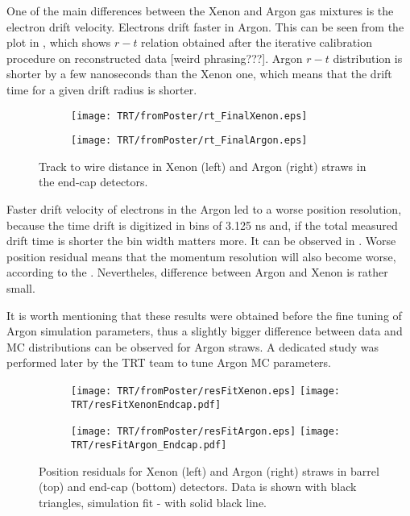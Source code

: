 One of the main differences between the Xenon and Argon gas mixtures is the electron drift velocity. Electrons drift faster in Argon. 
This can be seen from the plot in , 
which shows $r-t$ relation obtained after the iterative calibration procedure on reconstructed data [weird phrasing???].
Argon $r-t$ distribution is shorter by a few nanoseconds than the Xenon one, which means that the drift time for a given drift radius is shorter.

\begin{figure}
\begin{subfigure}{.5\textwidth}
  \centering
  \texttt{[image: TRT/fromPoster/rt\_FinalXenon.eps]}
\end{subfigure}%
\begin{subfigure}{.5\textwidth}
  \centering
  \texttt{[image: TRT/fromPoster/rt\_FinalArgon.eps]}
\end{subfigure}

\caption{Track to wire distance in Xenon (left) and Argon (right) straws in the end-cap detectors.}
  \label{fig:RT_xenon_argon}
\end{figure}

Faster drift velocity of electrons in the Argon led to a worse position resolution,
because the time drift is digitized in bins of 3.125 ns and, if the total measured drift time is shorter the bin width matters more.
It can be observed in . Worse position residual means that the momentum resolution will also become worse, according to the
. Nevertheles, difference between Argon and Xenon is rather small.

It is worth mentioning that these results were obtained before the fine tuning of Argon simulation parameters, thus a slightly bigger difference between 
data and MC distributions can be observed for Argon straws. A dedicated study was performed later by the TRT team to tune Argon MC parameters.

\begin{figure}

\begin{subfigure}{.5\textwidth}
  \centering
  \texttt{[image: TRT/fromPoster/resFitXenon.eps]}
  \texttt{[image: TRT/resFitXenonEndcap.pdf]}
\end{subfigure}%
\begin{subfigure}{.5\textwidth}
  \centering
  \texttt{[image: TRT/fromPoster/resFitArgon.eps]}
  \texttt{[image: TRT/resFitArgon\_Endcap.pdf]}
\end{subfigure}

\caption{Position residuals for Xenon (left) and Argon (right) straws in barrel (top) and end-cap (bottom) detectors. Data is shown with black triangles, 
simulation fit - with solid black line.}
  \label{fig:resFit}
\end{figure}

